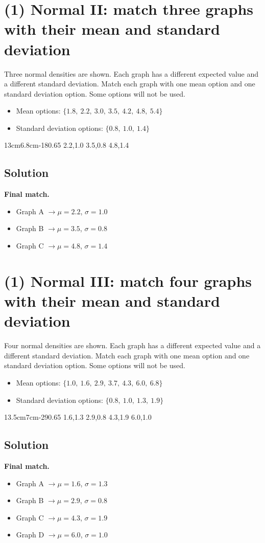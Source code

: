 \section{(1) Normal II: match three graphs with their mean and standard deviation}
Three normal densities are shown. Each graph has a different expected value and a different standard deviation.
Match each graph with one mean option and one standard deviation option. Some options will not be used.
\begin{itemize}
\item Mean options: $\{1.8,\ 2.2,\ 3.0,\ 3.5,\ 4.2,\ 4.8,\ 5.4\}$
\item Standard deviation options: $\{0.8,\ 1.0,\ 1.4\}$
\end{itemize}
\NormalThreeGraph
{13cm}{6.8cm}{-1}{8}{0.65}
{2.2,1.0}
{3.5,0.8}
{4.8,1.4}

\subsection*{Solution}
\textbf{Final match.}
\begin{itemize}
\item Graph A $\to \mu=2.2$, $\sigma=1.0$
\item Graph B $\to \mu=3.5$, $\sigma=0.8$
\item Graph C $\to \mu=4.8$, $\sigma=1.4$
\end{itemize}

\section{(1) Normal III: match four graphs with their mean and standard deviation}
Four normal densities are shown. Each graph has a different expected value and a different standard deviation.
Match each graph with one mean option and one standard deviation option. Some options will not be used.
\begin{itemize}
\item Mean options: $\{1.0,\ 1.6,\ 2.9,\ 3.7,\ 4.3,\ 6.0,\ 6.8\}$
\item Standard deviation options: $\{0.8,\ 1.0,\ 1.3,\ 1.9\}$
\end{itemize}
\NormalFourGraph
{13.5cm}{7cm}{-2}{9}{0.65}
{1.6,1.3}
{2.9,0.8}
{4.3,1.9}
{6.0,1.0}

\subsection*{Solution}
\textbf{Final match.}
\begin{itemize}
\item Graph A $\to \mu=1.6$, $\sigma=1.3$
\item Graph B $\to \mu=2.9$, $\sigma=0.8$
\item Graph C $\to \mu=4.3$, $\sigma=1.9$
\item Graph D $\to \mu=6.0$, $\sigma=1.0$
\end{itemize}

